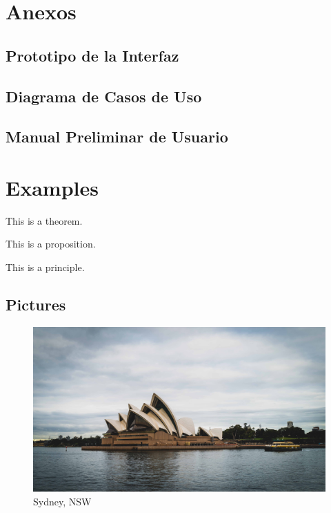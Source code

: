 \documentclass{article}
\begin{document}
\section{Anexos}
\subsection{Prototipo de la Interfaz}
\subsection{Diagrama de Casos de Uso}
\subsection{Manual Preliminar de Usuario}

\newpage
\section{Examples}

\begin{theorem}
	This is a theorem.
\end{theorem}

\begin{proposition}
	This is a proposition.
\end{proposition}

\begin{principle}
	This is a principle.
\end{principle}


\subsection{Pictures}

\begin{figure}[htbp]
	\center
	\includegraphics[scale=0.06]{img/photo.jpg}
	\caption{Sydney, NSW}
\end{figure}
\end{document}

